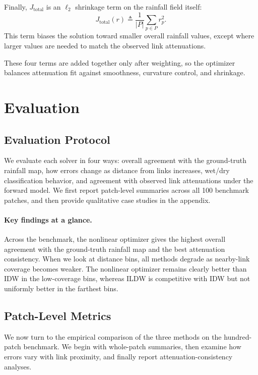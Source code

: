 \documentclass[11pt]{article}
\begin{document}
Finally, $J_{\mathrm{total}}$ is an $\ell_2$ shrinkage term on the rainfall field itself:
\[
J_{\mathrm{total}}(r)\triangleq\frac{1}{|P|}\sum_{p\in P}r_p^2.
\]
This term biases the solution toward smaller overall rainfall values, except where larger values are needed to match the observed link attenuations.

These four terms are added together only after weighting, so the optimizer balances attenuation fit against smoothness, curvature control, and shrinkage.

\section{Evaluation}
\subsection{Evaluation Protocol}
We evaluate each solver in four ways: overall agreement with the ground-truth rainfall map, how errors change as distance from links increases, wet/dry classification behavior, and agreement with observed link attenuations under the forward model. We first report patch-level summaries across all 100 benchmark patches, and then provide qualitative case studies in the appendix.

\paragraph*{Key findings at a glance.} Across the benchmark, the nonlinear optimizer gives the highest overall agreement with the ground-truth rainfall map and the best attenuation consistency. %
When we look at distance bins, all methods degrade as nearby-link coverage becomes weaker. The nonlinear optimizer remains clearly better than IDW in the low-coverage bins, whereas ILDW is competitive with IDW but not uniformly better in the farthest bins.

\subsection{Patch-Level Metrics}
We now turn to the empirical comparison of the three methods on the hundred-patch benchmark. We begin with whole-patch summaries, then examine how errors vary with link proximity, and finally report attenuation-consistency analyses.
\end{document}
